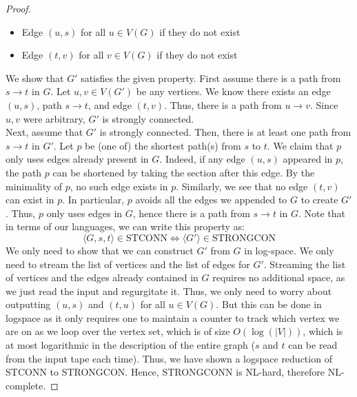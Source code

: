 \documentclass[12pt]{article}
\begin{document}
\begin{proof}
\begin{itemize}
        \item Edge $(u, s)$ for all $u \in V(G)$ if they do not exist
        \item Edge $(t, v)$ for all $v \in V(G)$ if they do not exist
    \end{itemize}
    We show that $G'$ satisfies the given property. First assume there is a path from $s \to t$ in $G$. Let $u, v \in V(G')$ be any vertices. We know there exists an edge $(u, s)$, path $s \to t$, and edge $(t, v)$. Thus, there is a path from $u \to v$. Since $u, v$ were arbitrary, $G'$ is strongly connected. \\
    Next, assume that $G'$ is strongly connected. Then, there is at least one path from $s \to t$ in $G'$. Let $p$ be (one of) the shortest path(s) from $s$ to $t$. We claim that $p$ only uses edges already present in $G$. Indeed, if any edge $(u, s)$ appeared in $p$, the path $p$ can be shortened by taking the section after this edge. By the minimality of $p$, no such edge exists in $p$. Similarly, we see that no edge $(t, v)$ can exist in $p$. In particular, $p$ avoids all the edges we appended to $G$ to create $G'$. Thus, $p$ only uses edges in $G$, hence there is a path from $s \to t$ in $G$. \bbni
    Note that in terms of our languages, we can write this property as: 
    \[ \langle G, s, t \rangle \in \text{STCONN} \iff \langle G' \rangle \in \text{STRONGCON}\]
    We only need to show that we can construct $G'$ from $G$ in log-space. We only need to stream the list of vertices and the list of edges for $G'$. Streaming the list of vertices and the edges already contained in $G$ requires no additional space, as we just read the input and regurgitate it. Thus, we only need to worry about outputting $(u, s)$ and $(t, u)$ for all $u \in V(G)$. But this can be done in logspace as it only requires one to maintain a counter to track which vertex we are on as we loop over the vertex set, which is of size $O(\log(|V|))$, which is at most logarithmic in the description of the entire graph ($s$ and $t$ can be read from the input tape each time). \bbni 
    Thus, we have shown a logspace reduction of STCONN to STRONGCON. Hence, STRONGCONN is NL-hard, therefore NL-complete. \bbni 
    
    
    
\end{proof}
\end{document}
